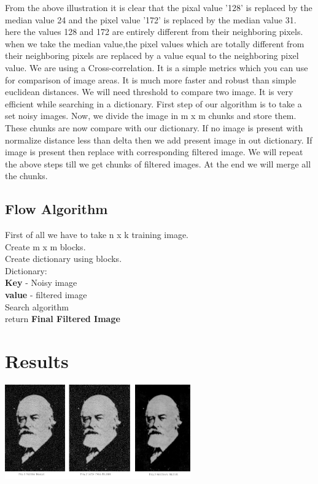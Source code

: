 \documentclass[journal]{IEEEtran}
\begin{document}
From the above illustration it is clear that the pixal value
’128’ is replaced by the median value 24 and the pixel value
’172’ is replaced by the median value 31. here the values 128
and 172 are entirely different from their neighboring pixels.
when we take the median value,the pixel values which are
totally different from their neighboring pixels are replaced by
a value equal to the neighboring pixel value.
We are using a Cross-correlation. It is a simple metrics which you can use for comparison of image areas. It is much more faster and robust than simple euclidean distances. We will need threshold to compare two image. It is very efficient while searching in a dictionary. 
First step of our algorithm is to take a set noisy images. Now, we divide the image in m x m chunks and store them. These chunks are now compare with our dictionary. If no image is present with normalize distance less than delta then we add present image in out dictionary. If image is present then replace with corresponding filtered image. We will repeat the above steps till we get chunks of filtered images.
At the end we will merge all the chunks.
 
 
\subsection{Flow Algorithm}
\begin{algorithm}
	First of all we have to take n x k training
	image.\\
		Create m x m blocks.\\
		Create dictionary using blocks.\\
		Dictionary:\\
		\hspace{1cm}	 \textbf{Key} - Noisy image\\
		\hspace{1cm}	 \textbf{value} - filtered image\\
		Search algorithm\\
	return \textbf{Final Filtered Image}
	\end{algorithm}
\section{Results}
	
\begin{minipage}{\linewidth}
	\centering
	\includegraphics[width=80mm]{output1.jpg}
\end{minipage} 
\end{document}
